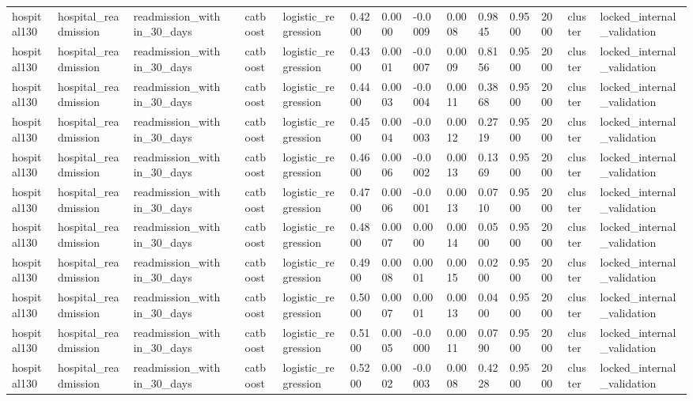 \begin{tabular}{lllllllllllllll}
hospital130 & hospital\_readmission & readmission\_within\_30\_days &  & catboost & logistic\_regression & 0.4200 & 0.0000 & -0.0009 & 0.0008 & 0.9845 & 0.9500 & 2000 & cluster & locked\_internal\_validation \\
hospital130 & hospital\_readmission & readmission\_within\_30\_days &  & catboost & logistic\_regression & 0.4300 & 0.0001 & -0.0007 & 0.0009 & 0.8156 & 0.9500 & 2000 & cluster & locked\_internal\_validation \\
hospital130 & hospital\_readmission & readmission\_within\_30\_days &  & catboost & logistic\_regression & 0.4400 & 0.0003 & -0.0004 & 0.0011 & 0.3868 & 0.9500 & 2000 & cluster & locked\_internal\_validation \\
hospital130 & hospital\_readmission & readmission\_within\_30\_days &  & catboost & logistic\_regression & 0.4500 & 0.0004 & -0.0003 & 0.0012 & 0.2719 & 0.9500 & 2000 & cluster & locked\_internal\_validation \\
hospital130 & hospital\_readmission & readmission\_within\_30\_days &  & catboost & logistic\_regression & 0.4600 & 0.0006 & -0.0002 & 0.0013 & 0.1369 & 0.9500 & 2000 & cluster & locked\_internal\_validation \\
hospital130 & hospital\_readmission & readmission\_within\_30\_days &  & catboost & logistic\_regression & 0.4700 & 0.0006 & -0.0001 & 0.0013 & 0.0710 & 0.9500 & 2000 & cluster & locked\_internal\_validation \\
hospital130 & hospital\_readmission & readmission\_within\_30\_days &  & catboost & logistic\_regression & 0.4800 & 0.0007 & 0.0000 & 0.0014 & 0.0500 & 0.9500 & 2000 & cluster & locked\_internal\_validation \\
hospital130 & hospital\_readmission & readmission\_within\_30\_days &  & catboost & logistic\_regression & 0.4900 & 0.0008 & 0.0001 & 0.0015 & 0.0200 & 0.9500 & 2000 & cluster & locked\_internal\_validation \\
hospital130 & hospital\_readmission & readmission\_within\_30\_days &  & catboost & logistic\_regression & 0.5000 & 0.0007 & 0.0001 & 0.0013 & 0.0400 & 0.9500 & 2000 & cluster & locked\_internal\_validation \\
hospital130 & hospital\_readmission & readmission\_within\_30\_days &  & catboost & logistic\_regression & 0.5100 & 0.0005 & -0.0000 & 0.0011 & 0.0790 & 0.9500 & 2000 & cluster & locked\_internal\_validation \\
hospital130 & hospital\_readmission & readmission\_within\_30\_days &  & catboost & logistic\_regression & 0.5200 & 0.0002 & -0.0003 & 0.0008 & 0.4228 & 0.9500 & 2000 & cluster & locked\_internal\_validation \\

\end{tabular}

